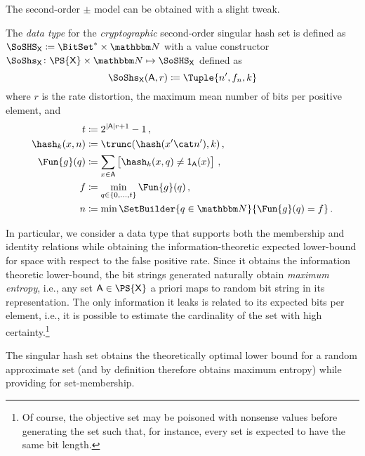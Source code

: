\documentclass[ ../main.tex]{subfiles}
\begin{document}
The second-order $\pm$ model can be obtained with a slight tweak.

\begin{definition}
    \label{alg:makesecondorder}
    The \emph{data type} for the \emph{cryptographic} second-order singular hash set is defined as $\SoSHS_{\Set{X}} \coloneqq \BitSet^* \times \NatSet$ with a value constructor $\SoShs_{\Set{X}} \colon \PS{\Set{X}} \times \NatSet \mapsto \SoSHS_{\Set{X}}$ defined as
    \begin{equation}
        \SoShs_{\Set{X}}(\Set{A},r) \coloneqq \Tuple{n',f_n,k}
    \end{equation}
    where $r$ is the rate distortion, the maximum mean number of bits per positive element, and
    \begin{equation}
        \begin{split}
            t			& \coloneqq 2^{\Card{\Set{A}} r+1}-1\,,\\
            \hash_k(x,n)& \coloneqq \trunc(\hash(x' \cat n'),k)\,,\\	
            \Fun{g}(q) 	& \coloneqq \sum_{{x \in \Set{A}}}\left[\hash_k(x,q) \neq \SetIndicator{\Set{A}}(x)\right]\,,\\
            f 			& \coloneqq \min_{q \in \{0,\ldots,t\}} \Fun{g}(q)\,,\\
            n			& \coloneqq \min \SetBuilder{q \in \NatSet}{\Fun{g}(q) = f}\,.\\	
        \end{split}
    \end{equation}
\end{definition}





In particular, we consider a data type that supports both the membership and identity relations while obtaining the information-theoretic expected lower-bound for space with respect to the false positive rate.
Since it obtains the information theoretic lower-bound, the bit strings generated naturally obtain \emph{maximum entropy}, i.e., any set $\Set{A} \in \PS{\Set{X}}$ a priori maps to random bit string in its representation.
The only information it leaks is related to its expected bits per element, i.e., it is possible to estimate the cardinality of the set with high certainty.\footnote{Of course, the objective set may be poisoned with nonsense values before generating the set such that, for instance, every set is expected to have the same bit length.}


The singular hash set obtains the theoretically optimal lower bound for a random approximate set (and by definition therefore obtains maximum entropy) while providing for set-membership.
\end{document}
